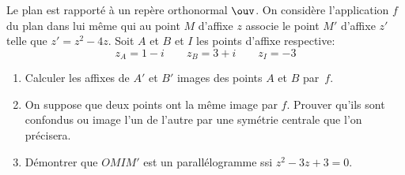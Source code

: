 \begin{exercice}

 Le plan est rapport\'e \`a un rep\`ere
  orthonormal $\ouv$. On consid\`ere l'application $f$ du plan dans
  lui m\^eme qui au point $M$ d'affixe $z$ associe le point $M'$
  d'affixe $z'$ telle que $z'=z^2-4z$. Soit $A$ et $B$ et $I$ les points
  d'affixe respective:
\[z_A=1-i \qquad z_B=3+i \qquad z_I=-3\] 
\begin{enumerate}
\item Calculer les affixes de $A'$ et $B'$ images des points $A$ et
  $B$ par~$f$.
\item On suppose que deux points ont la m\^eme image par $f$. Prouver
  qu'ils sont confondus ou image l'un de l'autre par une sym\'etrie
  centrale que l'on pr\'ecisera.
\item D\'emontrer que $OMIM'$ est un parall\'elogramme ssi
  $z^2-3z+3=0$. 
\end{enumerate}
\end{exercice}

